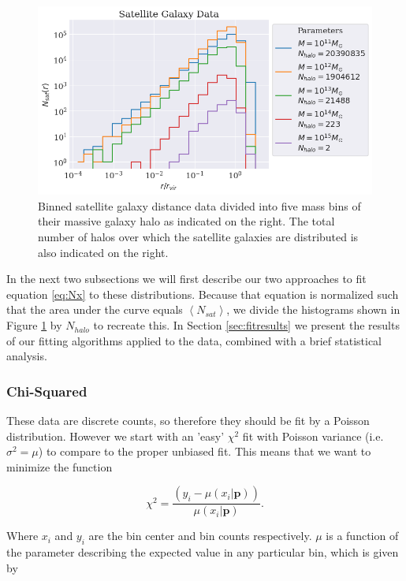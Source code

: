 \begin{figure}
    \centering
    \includegraphics[width=\textwidth]{results/satellite_data.png}
    \caption{Binned satellite galaxy distance data divided into five mass bins of their massive galaxy halo as indicated on the right. The total number of halos over which the satellite galaxies are distributed is also indicated on the right.}
    \label{fig:sat_data}
\end{figure}

In the next two subsections we will first describe our two approaches to fit equation \ref{eq:Nx} to these distributions. Because that equation is normalized such that the area under the curve equals $\left<N_{sat}\right>$, we divide the histograms shown in Figure \ref{fig:sat_data} by $N_{halo}$ to recreate this. In Section \ref{sec:fitresults} we present the results of our fitting algorithms applied to the data, combined with a brief statistical analysis.

\subsubsection{Chi-Squared}

These data are discrete counts, so therefore they should be fit by a Poisson distribution. However we start with an 'easy' $\chi^2$ fit with Poisson variance (i.e. $\sigma^2 = \mu$) to compare to the proper unbiased fit. This means that we want to minimize the function

\begin{equation}
    \chi^2 = \frac{\left(y_i - \mu(x_i | \boldsymbol{p})\right)}{\mu(x_i | \boldsymbol{p})}.\label{eq:chi2}
\end{equation}

Where $x_i$ and $y_i$ are the bin center and bin counts respectively. $\mu$ is a function of the parameter describing the expected value in any particular bin, which is given by

